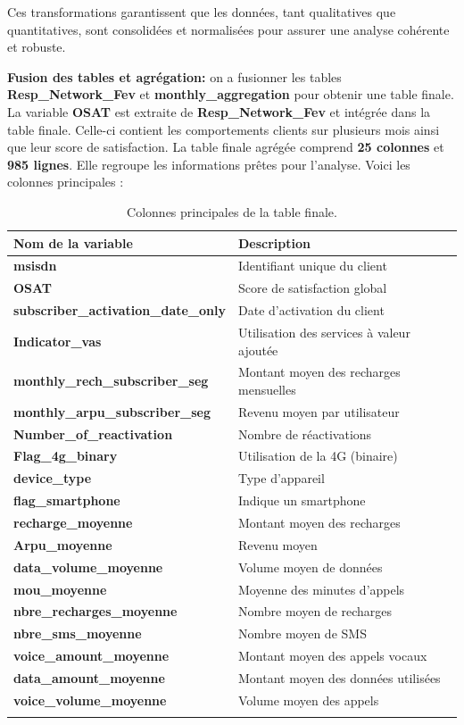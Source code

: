 Ces transformations garantissent que les données, tant qualitatives que quantitatives, sont consolidées et normalisées pour assurer une analyse cohérente et robuste.


\noindent \textbf{\checkmark Fusion des tables et agrégation:} on a fusionner les tables \textbf{Resp\_Network\_Fev} et \textbf{monthly\_aggregation} pour obtenir une table finale. La variable \textbf{OSAT} est extraite de \textbf{Resp\_Network\_Fev} et intégrée dans la table finale. Celle-ci contient les comportements clients sur plusieurs mois ainsi que leur score de satisfaction.
La table finale agrégée comprend \textbf{25 colonnes} et \textbf{985 lignes}. Elle regroupe les informations prêtes pour l'analyse. Voici les colonnes principales :

\begin{longtable}{|p{7cm}|p{9cm}|}
    \hline
    \textbf{Nom de la variable} & \textbf{Description} \\ \hline
    \textbf{msisdn} & Identifiant unique du client \\ \hline
    \textbf{OSAT} & Score de satisfaction global \\ \hline
    \textbf{subscriber\_activation\_date\_only} & Date d'activation du client \\ \hline
    \textbf{Indicator\_vas} & Utilisation des services à valeur ajoutée \\ \hline
    \textbf{monthly\_rech\_subscriber\_seg} & Montant moyen des recharges mensuelles \\ \hline
    \textbf{monthly\_arpu\_subscriber\_seg} & Revenu moyen par utilisateur \\ \hline
    \textbf{Number\_of\_reactivation} & Nombre de réactivations \\ \hline
    \textbf{Flag\_4g\_binary} & Utilisation de la 4G (binaire) \\ \hline
    \textbf{device\_type} & Type d'appareil \\ \hline
    \textbf{flag\_smartphone} & Indique un smartphone \\ \hline
    \textbf{recharge\_moyenne} & Montant moyen des recharges \\ \hline
    \textbf{Arpu\_moyenne} & Revenu moyen \\ \hline
    \textbf{data\_volume\_moyenne} & Volume moyen de données \\ \hline
    \textbf{mou\_moyenne} & Moyenne des minutes d'appels \\ \hline
    \textbf{nbre\_recharges\_moyenne} & Nombre moyen de recharges \\ \hline
    \textbf{nbre\_sms\_moyenne} & Nombre moyen de SMS \\ \hline
    \textbf{voice\_amount\_moyenne} & Montant moyen des appels vocaux \\ \hline
    \textbf{data\_amount\_moyenne} & Montant moyen des données utilisées \\ \hline
    \textbf{voice\_volume\_moyenne} & Volume moyen des appels \\ \hline
\caption{Colonnes principales de la table finale.}
\label{table:variables_final}
\end{longtable}
